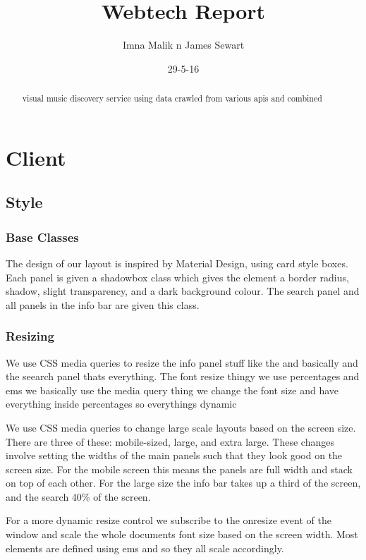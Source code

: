 \documentclass[10pt]{article}
\title{Webtech Report}
\author{Imna Malik n James Sewart}
\date{29-5-16}
\begin{document}
    \maketitle

    \tableofcontents


    \begin{abstract}
        visual music discovery service using data crawled from various apis and combined
    \end{abstract}

    \section{Client}
        \subsection{Style}
            \subsubsection{Base Classes}
                The design of our layout is inspired by Material Design, using card style boxes. Each panel is given a shadowbox class which gives the element a border radius, shadow, slight transparency, and a dark background colour. The search panel and all panels in the info bar are given this class.

            \subsubsection{Resizing}
                We use CSS media queries to resize the info panel stuff like the and basically and the seearch panel thats everything. The font resize thingy we use percentages and ems we basically use the media query thing we change the font size and have everything inside percentages so everythings dynamic

                We use CSS media queries to change large scale layouts based on the screen size. There are three of these: mobile-sized, large, and extra large. These changes involve setting the widths of the main panels such that they look good on the screen size. For the mobile screen this means the panels are full width and stack on top of each other. For the large size the info bar takes up a third of the screen, and the search 40\% of the screen.

                For a more dynamic resize control we subscribe to the onresize event of the window and scale the whole documents font size based on the screen width. Most elements are defined using ems and so they all scale accordingly.
\end{document}

